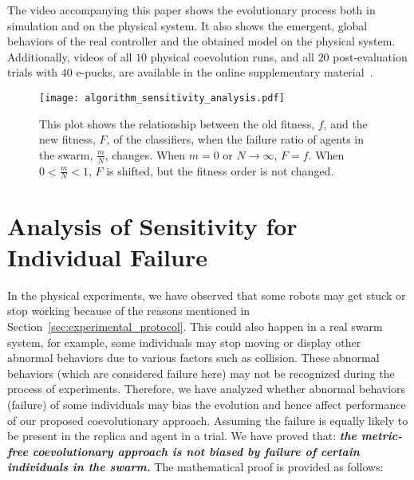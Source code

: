 The video accompanying this paper shows the evolutionary process both in simulation and on the physical system. It also shows the emergent, global behaviors of the real controller and the obtained model on the physical system. Additionally, videos of all $10$ physical coevolution runs, and all $20$ post-evaluation trials with $40$ e-pucks, are available in the online supplementary material~\cite{online_supplementary_material_tevc2014}.

\begin{figure}[!t]
    \centering
    \texttt{[image: algorithm\_sensitivity\_analysis.pdf]}
    \caption{This plot shows the relationship between the old fitness, $f$, and the new fitness, $F$, of the classifiers, when the failure ratio of agents in the swarm, $\frac{m}{N}$, changes. When $m = 0$ or $N \rightarrow \infty$, $F=f$. When $0 < \frac{m}{N} < 1$, $F$ is shifted, but the fitness order is not changed.}
    \label{fig:analysis_algorithm}
\end{figure}

\section{Analysis of Sensitivity for Individual Failure}\label{sec:analysis_algorithm}

In the physical experiments, we have observed that some robots may get stuck or stop working because of the reasons mentioned in Section~\ref{sec:experimental_protocol}. This could also happen in a real swarm system, for example, some individuals may stop moving or display other abnormal behaviors due to various factors such as collision. These abnormal behaviors (which are considered failure here) may not be recognized during the process of experiments. Therefore, we have analyzed whether abnormal behaviors (failure) of some individuals may bias the evolution and hence affect performance of our proposed coevolutionary approach. Assuming the failure is equally likely to be present in the replica and agent in a trial. We have proved that: \textit{\textbf{the metric-free coevolutionary approach is not biased by failure of certain individuals in the swarm.}} The mathematical proof is provided as follows:
 
